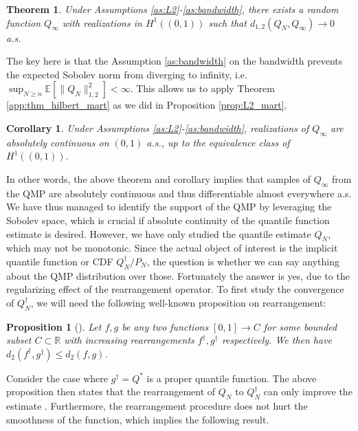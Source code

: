 \documentclass[11pt,a4paper]{article}
\newtheorem{theorem}{Theorem}%
\newtheorem{corollary}{Corollary}
\newtheorem{proposition}{Proposition}%
\newenvironment{proof_outline}{\begin{proof}[Proof outline]}{\end{proof}}
\newcommand{\R}{\mathbb{R}}
\newcommand{\E}{\mathbb{E}}
\begin{document}
\begin{theorem}\label{th:sobolev_mart}
     Under {Assumptions \ref{as:L2}}-{\ref{as:bandwidth}}, there exists a random function $Q_\infty$ with realizations in $H^1((0,1))$ such that $d_{1,2}\left(Q_N,Q_\infty\right) \to 0$ a.s. 
\end{theorem}
\begin{proof_outline}
The key here is that the {Assumption \ref{as:bandwidth}} on the bandwidth prevents the expected Sobolev norm from diverging to infinity, i.e. $\sup_{N \geq n} \E\left[\|Q_N\|^2_{1,2}\right]<\infty$. This allows us to apply {Theorem \ref{app:thm_hilbert_mart}} as we did in {Proposition \ref{prop:L2_mart}}.
\end{proof_outline}
\begin{corollary}\label{cor:continuous}
Under {Assumptions \ref{as:L2}}-{\ref{as:bandwidth}}, realizations of $Q_\infty$ are absolutely continuous on $(0,1)$ a.s., up to the equivalence class of $H^1((0,1))$. 
\end{corollary}
In other words, the above theorem and corollary implies that samples of $Q_\infty$ from the QMP are  absolutely continuous and thus differentiable almost everywhere a.s. We have thus managed to identify the support of the QMP by leveraging the Sobolev space, which is crucial if absolute continuity of the quantile function estimate is desired. However, we have only studied the quantile estimate $Q_N$, which may not be monotonic. Since the actual object of interest is the implicit quantile function or CDF $Q_N^{\dagger}/P_N$, the question is whether we can say anything about the QMP distribution over those. Fortunately the answer is yes, due to the regularizing effect of the rearrangement operator. To first study the convergence of $Q_N^{\dagger}$, we will need the following well-known proposition on rearrangement:
\begin{proposition}[\cite{Lorentz1953, Chernozhukov2009}]\label{prop:rearr}
    Let $f,g$ be any two functions $[0,1] \to C$ for some bounded subset $C \subset \R$ with increasing rearrangements $f^{\dagger},g^{\dagger}$ respectively. We then have 
$d_2(f^{\dagger},g^{\dagger}) \leq  d_2(f,g)$.\end{proposition}
Consider the case where $g^{\dagger} = Q^*$ is a proper quantile function. The above proposition then states that the rearrangement of $Q_N$ to $Q_N^{\dagger}$ can only improve the estimate \citep{Chernozhukov2009}. Furthermore, the rearrangement procedure does not hurt the smoothness of the function, which implies the following result.
\end{document}

